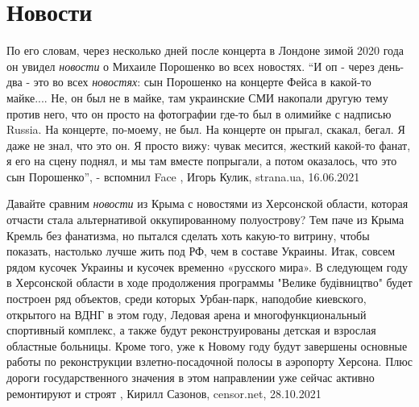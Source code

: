  
 
 
 
 
\chapter{Новости}
\label{sec:slova.novosti}

По его словам, через несколько дней после концерта в Лондоне зимой 2020 года он
увидел \emph{новости} о Михаиле Порошенко во всех новостях.  \enquote{И оп - через день-два -
это во всех \emph{новостях}: сын Порошенко на концерте Фейса в какой-то майке.... Не,
он был не в майке, там украинские СМИ накопали другую тему против него, что он
просто на фотографии где-то был в олимийке с надписью Russia. На концерте,
по-моему, не был. На концерте он прыгал, скакал, бегал. Я даже не знал, что это
он. Я просто вижу: чувак месится, жесткий какой-то фанат, я его на сцену
поднял, и мы там вместе попрыгали, а потом оказалось, что это сын Порошенко}, -
вспомнил Face
, 
Игорь Кулик, strana.ua, 16.06.2021

Давайте сравним \emph{новости} из Крыма с новостями из Херсонской области, которая
отчасти стала альтернативой оккупированному полуострову? Тем паче из Крыма
Кремль без фанатизма, но пытался сделать хоть какую-то витрину, чтобы показать,
настолько лучше жить под РФ, чем в составе Украины. Итак, совсем рядом кусочек
Украины и кусочек временно «русского мира». В следующем году в Херсонской
области в ходе продолжения программы "Велике будівництво" будет построен ряд
объектов, среди которых Урбан-парк, наподобие киевского, открытого на ВДНГ в
этом году, Ледовая арена и многофункциональный спортивный комплекс, а также
будут реконструированы детская и взрослая областные больницы. Кроме того, уже к
Новому году будут завершены основные работы по реконструкции взлетно-посадочной
полосы в аэропорту Херсона. Плюс дороги государственного значения в этом
направлении уже сейчас активно ремонтируют и строят 
, Кирилл Сазонов, censor.net, 28.10.2021%

